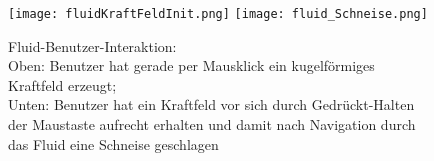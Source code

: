 	


\begin{figure}[!h]
	\texttt{[image: fluidKraftFeldInit.png]} 
	\texttt{[image: fluid\_Schneise.png]}
	\caption{ 
		Fluid-Benutzer-Interaktion:\\
		Oben: Benutzer hat gerade per Mausklick ein kugelförmiges Kraftfeld erzeugt;\\
		Unten: Benutzer hat ein Kraftfeld vor sich durch Gedrückt-Halten der Maustaste aufrecht erhalten
		und damit nach Navigation durch das Fluid eine Schneise geschlagen
	}
	\label{fig:fluidSimForcePix}
\end{figure}






\clearpage
